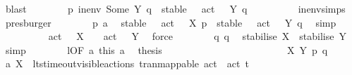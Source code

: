 \begin{isabellebody}
\ blast\isanewline
\ \ \ \ \ \ \isamarkupfalse%
\ p{}{\isacharcolon}{\kern0pt}\ {\isacartoucheopen}in{\isacharunderscore}{\kern0pt}env\ {\isacharparenleft}{\kern0pt}Some\ Y{\isacharparenright}{\kern0pt}\ q\ {\isacharequal}{\kern0pt}\ stable\ {\isacharbraceleft}{\kern0pt}{\isasymalpha}\ {\isachardot}{\kern0pt}\ act\ {\isasymalpha}\ {\isasymin}\ Y{\isacharbraceright}{\kern0pt}\ q{\isacartoucheclose}\isanewline
\ \ \ \ \ \ \ \ \isamarkupfalse%
\ in{\isacharunderscore}{\kern0pt}env{\isachardot}{\kern0pt}simps{\isacharparenleft}{\kern0pt}{}{\isacharparenright}{\kern0pt}\ \isamarkupfalse%
\ presburger\isanewline
\ \ \ \ \ \ \isamarkupfalse%
\ p{}\ a{}\ \isamarkupfalse%
\ {\isacartoucheopen}stable\ {\isacharbraceleft}{\kern0pt}{\isasymalpha}\ {\isachardot}{\kern0pt}\ act\ {\isasymalpha}\ {\isasymin}\ X{\isacharbraceright}{\kern0pt}\ p\ {\isacharequal}{\kern0pt}\ stable\ {\isacharbraceleft}{\kern0pt}{\isasymalpha}\ {\isachardot}{\kern0pt}\ act\ {\isasymalpha}\ {\isasymin}\ Y{\isacharbraceright}{\kern0pt}\ q{\isacartoucheclose}\ \isamarkupfalse%
\ simp\isanewline
\ \ \ \ \ \ \isamarkupfalse%
\ {\isacartoucheopen}{\isacharbraceleft}{\kern0pt}{\isasymalpha}\ {\isachardot}{\kern0pt}\ act\ {\isasymalpha}\ {\isasymin}\ X{\isacharbraceright}{\kern0pt}\ {\isacharequal}{\kern0pt}\ {\isacharbraceleft}{\kern0pt}{\isasymalpha}\ {\isachardot}{\kern0pt}\ act\ {\isasymalpha}\ {\isasymin}\ Y{\isacharbraceright}{\kern0pt}{\isacartoucheclose}\ \isamarkupfalse%
\ force\isanewline
\ \ \ \ \ \ \isamarkupfalse%
\ q{}\ q{}\ \isamarkupfalse%
\ {\isacartoucheopen}stabilise\ X\ {\isacharequal}{\kern0pt}\ stabilise\ Y{\isacartoucheclose}\ \isamarkupfalse%
\ simp\isanewline
\ \ \ \ \ \ \isamarkupfalse%
\ l{}{\isacharbrackleft}{\kern0pt}OF\ a{}\ this\ a{}{\isacharbrackright}{\kern0pt}\ \isamarkupfalse%
\ {\isacharquery}{\kern0pt}thesis\ \isacommand{{\isachardot}{\kern0pt}}\isamarkupfalse%
\isanewline
\ \ \ \ \isamarkupfalse%
\isanewline
\ \ \isamarkupfalse%
\isanewline
\ \ \isamarkupfalse%
\ \isamarkupfalse%
\ {\isacharminus}{\kern0pt}\isanewline
\ \ \ \ \isanewline
\ \ \ \ \isamarkupfalse%
\ X\ Y\ p\ q\isanewline
\ \ \ \ \isamarkupfalse%
\ a{}{\isacharcolon}{\kern0pt}\ {\isachardoublequoteopen}X\ {\isasymsubseteq}\ lts{\isacharunderscore}{\kern0pt}timeout{\isachardot}{\kern0pt}visible{\isacharunderscore}{\kern0pt}actions\ tran{\isacharunderscore}{\kern0pt}mappable\ {\isacharparenleft}{\kern0pt}act\ {\isasymtau}{\isacharparenright}{\kern0pt}\ {\isacharparenleft}{\kern0pt}act\ t{\isacharparenright}{\kern0pt}{\isachardoublequoteclose}\isanewline

\end{isabellebody}
